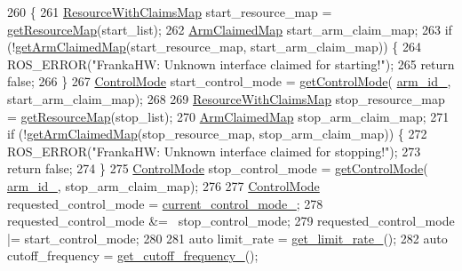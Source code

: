 \begin{DoxyCode}
260                                                                                          \{
261   \hyperlink{namespacefranka__hw_a1fae0c56c9a08fdeb137e601f876cc77}{ResourceWithClaimsMap} start\_resource\_map = \hyperlink{namespacefranka__hw_a6c621829dd30c8ff939de6ae0861966d}{getResourceMap}(start\_list);
262   \hyperlink{namespacefranka__hw_a9b9c672b3e064953e816024fc2f9cf0f}{ArmClaimedMap} start\_arm\_claim\_map;
263   \textcolor{keywordflow}{if} (!\hyperlink{namespacefranka__hw_af08f089686416ffb7904fbe86f19b8a9}{getArmClaimedMap}(start\_resource\_map, start\_arm\_claim\_map)) \{
264     ROS\_ERROR(\textcolor{stringliteral}{"FrankaHW: Unknown interface claimed for starting!"});
265     \textcolor{keywordflow}{return} \textcolor{keyword}{false};
266   \}
267   \hyperlink{namespacefranka__hw_afa416558ce4baace5ac6c71bd5d2c98c}{ControlMode} start\_control\_mode = \hyperlink{namespacefranka__hw_a21fc3cb90700f7fc2b9b9a93c2d40d0a}{getControlMode}(
      \hyperlink{classfranka__hw_1_1FrankaHW_acb16f326973e2eb1c33c28f71492d7d5}{arm\_id\_}, start\_arm\_claim\_map);
268 
269   \hyperlink{namespacefranka__hw_a1fae0c56c9a08fdeb137e601f876cc77}{ResourceWithClaimsMap} stop\_resource\_map = \hyperlink{namespacefranka__hw_a6c621829dd30c8ff939de6ae0861966d}{getResourceMap}(stop\_list);
270   \hyperlink{namespacefranka__hw_a9b9c672b3e064953e816024fc2f9cf0f}{ArmClaimedMap} stop\_arm\_claim\_map;
271   \textcolor{keywordflow}{if} (!\hyperlink{namespacefranka__hw_af08f089686416ffb7904fbe86f19b8a9}{getArmClaimedMap}(stop\_resource\_map, stop\_arm\_claim\_map)) \{
272     ROS\_ERROR(\textcolor{stringliteral}{"FrankaHW: Unknown interface claimed for stopping!"});
273     \textcolor{keywordflow}{return} \textcolor{keyword}{false};
274   \}
275   \hyperlink{namespacefranka__hw_afa416558ce4baace5ac6c71bd5d2c98c}{ControlMode} stop\_control\_mode = \hyperlink{namespacefranka__hw_a21fc3cb90700f7fc2b9b9a93c2d40d0a}{getControlMode}(
      \hyperlink{classfranka__hw_1_1FrankaHW_acb16f326973e2eb1c33c28f71492d7d5}{arm\_id\_}, stop\_arm\_claim\_map);
276 
277   \hyperlink{namespacefranka__hw_afa416558ce4baace5ac6c71bd5d2c98c}{ControlMode} requested\_control\_mode = \hyperlink{classfranka__hw_1_1FrankaHW_a4eb4ed0043449742cadefa5809d9c6f0}{current\_control\_mode\_};
278   requested\_control\_mode &= ~stop\_control\_mode;
279   requested\_control\_mode |= start\_control\_mode;
280 
281   \textcolor{keyword}{auto} limit\_rate = \hyperlink{classfranka__hw_1_1FrankaHW_a0d26d3a30e63e83e19cad138a9811fc7}{get\_limit\_rate\_}();
282   \textcolor{keyword}{auto} cutoff\_frequency = \hyperlink{classfranka__hw_1_1FrankaHW_ada3ea355cd85b06247ee9def60485240}{get\_cutoff\_frequency\_}();

\end{DoxyCode}
